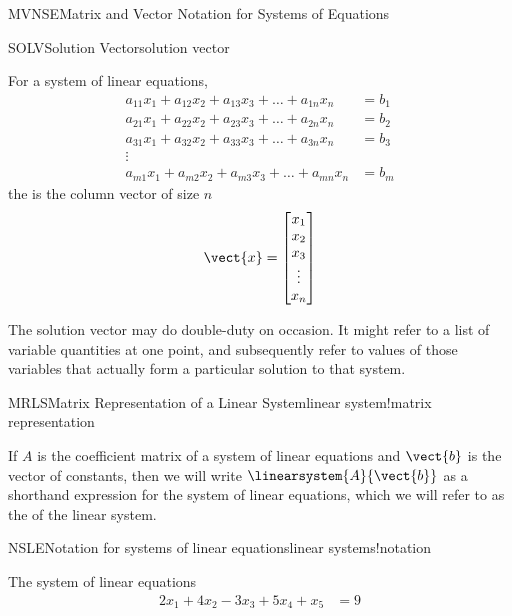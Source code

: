 \begin{subsect}{MVNSE}{Matrix and Vector Notation for Systems of Equations}
\begin{definition}{SOLV}{Solution Vector}{solution vector}
\begin{para}For a system of linear equations,
\begin{align*}
a_{11}x_1+a_{12}x_2+a_{13}x_3+\dots+a_{1n}x_n&=b_1\\
a_{21}x_1+a_{22}x_2+a_{23}x_3+\dots+a_{2n}x_n&=b_2\\
a_{31}x_1+a_{32}x_2+a_{33}x_3+\dots+a_{3n}x_n&=b_3\\
\vdots&\\
a_{m1}x_1+a_{m2}x_2+a_{m3}x_3+\dots+a_{mn}x_n&=b_m
\end{align*}
the  is the column vector of size $n$
\begin{equation*}
\vect{x}=
\begin{bmatrix}
x_1\\
x_2\\
x_3\\
\vdots\\
x_n\\
\end{bmatrix}
\end{equation*}
\end{para}
\end{definition}
%
\begin{para}The solution vector may do double-duty on occasion.  It might refer to a list of variable quantities at one point, and subsequently refer to values of those variables that actually form a particular solution to that system.\end{para}
%
\begin{definition}{MRLS}{Matrix Representation of a Linear System}{linear system!matrix representation}
\begin{para}If $A$ is the coefficient matrix of a system of linear equations and $\vect{b}$ is the vector of constants, then we will write $\linearsystem{A}{\vect{b}}$ as a shorthand expression for the  system of linear equations, which we will refer to as the  of the linear system.\end{para}
\end{definition}
%
\begin{example}{NSLE}{Notation for systems of linear equations}{linear systems!notation}
\begin{para}The system of linear equations
%
\begin{align*}
2x_1+4x_2-3x_3+5x_4+x_5&=9\\

\end{align*}
\end{para}
\end{example}
\end{subsect}
